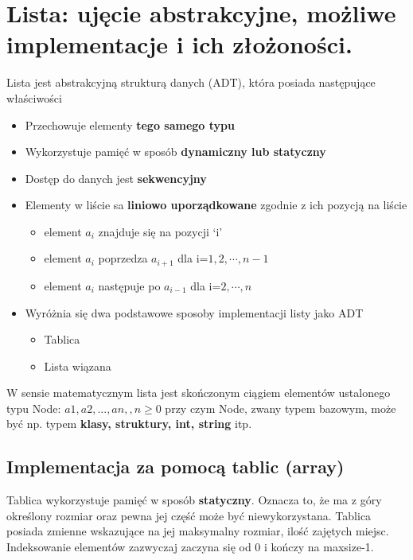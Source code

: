 \documentclass[12pt]{article}
\begin{document}
    \section{Lista: ujęcie abstrakcyjne, możliwe implementacje i ich złożoności.}
    \begin{definition}
        Lista jest abstrakcyjną strukturą danych (ADT), która posiada następujące właściwości
        \begin{itemize}
            \item Przechowuje elementy \textbf{tego samego typu}
            \item Wykorzystuje pamięć w sposób \textbf{dynamiczny lub statyczny}
            \item Dostęp do danych jest \textbf{sekwencyjny}
            \item Elementy w liście sa \textbf{liniowo uporządkowane} zgodnie z ich pozycją na liście
            \begin{itemize}
                \item element $a_i$ znajduje się na pozycji ‘i’
                \item element $a_i$ poprzedza $a_{i+1}$ dla i=$1,2,\cdots,n-1$
                \item element $a_i$ następuje po $a_{i-1}$ dla i=$2,\cdots,n$
            \end{itemize}
            \item Wyróżnia się dwa podstawowe sposoby implementacji listy jako ADT
            \begin{itemize}
                \item Tablica
                \item Lista wiązana
            \end{itemize}
        \end{itemize}
    \end{definition}

    \begin{definition}
        W sensie matematycznym lista jest skończonym ciągiem elementów ustalonego typu
        Node: $a1, a2, . . . , an, , n \geq 0$
        przy czym Node, zwany typem bazowym, może być np. typem \textbf{klasy, struktury, int,
        string} itp.
    \end{definition}

    \subsection{Implementacja za pomocą tablic (array)}
    Tablica wykorzystuje pamięć w sposób \textbf{statyczny}. Oznacza to, że ma z góry określony rozmiar oraz pewna jej część może być niewykorzystana. Tablica posiada zmienne wskazujące na jej maksymalny rozmiar, ilość zajętych miejsc. Indeksowanie elementów zazwyczaj zaczyna się od 0 i kończy na maxsize-1.
\end{document}
